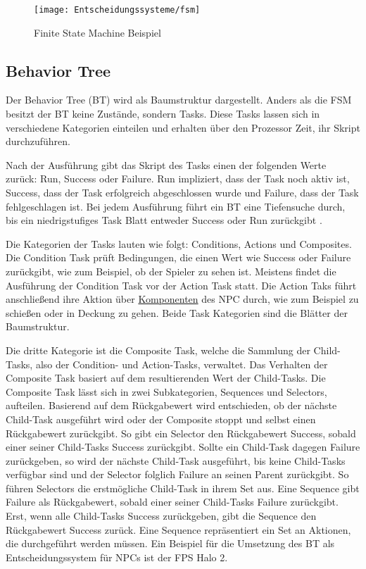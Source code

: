 \begin{figure}[h]
  \centering
  \texttt{[image: Entscheidungssysteme/fsm]}
	\captionsetup{justification=justified, format=plain}
  \caption{Finite State Machine Beispiel}
  \label{fig:ES FSM}
\end{figure}


\subsection{Behavior Tree}
\label{chap:bt}

Der Behavior Tree (BT) wird als Baumstruktur dargestellt. Anders als die FSM besitzt der BT keine Zust\"{a}nde, sondern Tasks. Diese Tasks lassen sich in verschiedene Kategorien einteilen und erhalten \"{u}ber den Prozessor Zeit, ihr Skript durchzuf\"{u}hren.

Nach der Ausf\"{u}hrung gibt das Skript des Tasks einen der folgenden Werte zur\"{u}ck: Run, Success oder Failure. Run impliziert, dass der Task noch aktiv ist, Success, dass der Task erfolgreich abgeschlossen wurde und Failure, dass der Task fehlgeschlagen ist. Bei jedem Ausf\"{u}hrung f\"{u}hrt ein BT eine Tiefensuche durch, bis ein niedrigstufiges Task Blatt entweder Success oder Run zur\"{u}ckgibt \autocite{qlbt}.

Die Kategorien der Tasks lauten wie folgt: Conditions, Actions und Composites. Die Condition Task pr\"{u}ft Bedingungen, die einen Wert wie Success oder Failure zur\"{u}ckgibt, wie zum Beispiel, ob der Spieler zu sehen ist. Meistens findet die Ausf\"{u}hrung der Condition Task vor der Action Task statt. Die Action Taks f\"{u}hrt anschlie\ss{}end ihre Aktion \"{u}ber \hyperref[chap:game-objects]{Komponenten} des NPC durch, wie zum Beispiel zu schie\ss{}en oder in Deckung zu gehen. Beide Task Kategorien sind die Bl\"{a}tter der Baumstruktur.

Die dritte Kategorie ist die Composite Task, welche die Sammlung der Child-Tasks, also der Condition- und Action-Tasks, verwaltet. Das Verhalten der Composite Task basiert auf dem resultierenden Wert der Child-Tasks. Die Composite Task l\"{a}sst sich in zwei Subkategorien, Sequences und Selectors, aufteilen. Basierend auf dem R\"{u}ckgabewert wird entschieden, ob der n\"{a}chste Child-Task ausgef\"{u}hrt wird oder der Composite stoppt und selbst einen R\"{u}ckgabewert zur\"{u}ckgibt. So gibt ein Selector den R\"{u}ckgabewert Success, sobald einer seiner Child-Tasks Success zur\"{u}ckgibt. Sollte ein Child-Task dagegen Failure zur\"{u}ckgeben, so wird der n\"{a}chste Child-Task ausgef\"{u}hrt, bis keine Child-Tasks verf\"{u}gbar sind und der Selector folglich Failure an seinen Parent zur\"{u}ckgibt. So f\"{u}hren Selectors die erstm\"{o}gliche Child-Task in ihrem Set aus. Eine Sequence gibt Failure als R\"{u}ckgabewert, sobald einer seiner Child-Tasks Failure zur\"{u}ckgibt. Erst, wenn alle Child-Tasks Success zur\"{u}ckgeben, gibt die Sequence den R\"{u}ckgabewert Success zur\"{u}ck. Eine Sequence repr\"{a}sentiert ein Set an Aktionen, die durchgef\"{u}hrt werden m\"{u}ssen. Ein Beispiel f\"{u}r die Umsetzung des BT als Entscheidungssystem f\"{u}r NPCs ist der FPS Halo 2.

